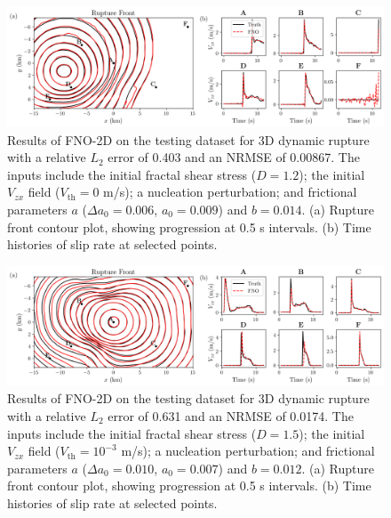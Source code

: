 \documentclass[a4paper,11pt]{article}
\begin{document}
\begin{figure}[H]
    \centering
    \includegraphics[width=1.0\linewidth]{figures/V2/si/3D/4.png}
    \caption{\label{fig:3D_mu_5std}Results of FNO-2D on the testing dataset for 3D dynamic rupture with a relative \(L_2\) error of 0.403 and an NRMSE of 0.00867. The inputs include the initial fractal shear stress (\(D = 1.2\)); the initial \(V_{zx}\) field (\(V_\text{th} = 0\) m/s); a nucleation perturbation; and frictional parameters \(a\) (\(\Delta a_0 = 0.006\), \(a_0 = 0.009\)) and \(b = 0.014\). (a) Rupture front contour plot, showing progression at 0.5 s intervals. (b) Time histories of slip rate at selected points.
    }
\end{figure}

\begin{figure}[H]
    \centering
    \includegraphics[width=1.0\linewidth]{figures/V2/si/3D/6.png}
    \caption{\label{fig:3D_mu_6std}Results of FNO-2D on the testing dataset for 3D dynamic rupture with a relative \(L_2\) error of 0.631 and an NRMSE of 0.0174. The inputs include the initial fractal shear stress (\(D = 1.5\)); the initial \(V_{zx}\) field (\(V_\text{th} = 10^{-3}\) m/s); a nucleation perturbation; and frictional parameters \(a\) (\(\Delta a_0 = 0.010\), \(a_0 = 0.007\)) and \(b = 0.012\). (a) Rupture front contour plot, showing progression at 0.5 s intervals. (b) Time histories of slip rate at selected points.
    }
\end{figure}
\end{document}
